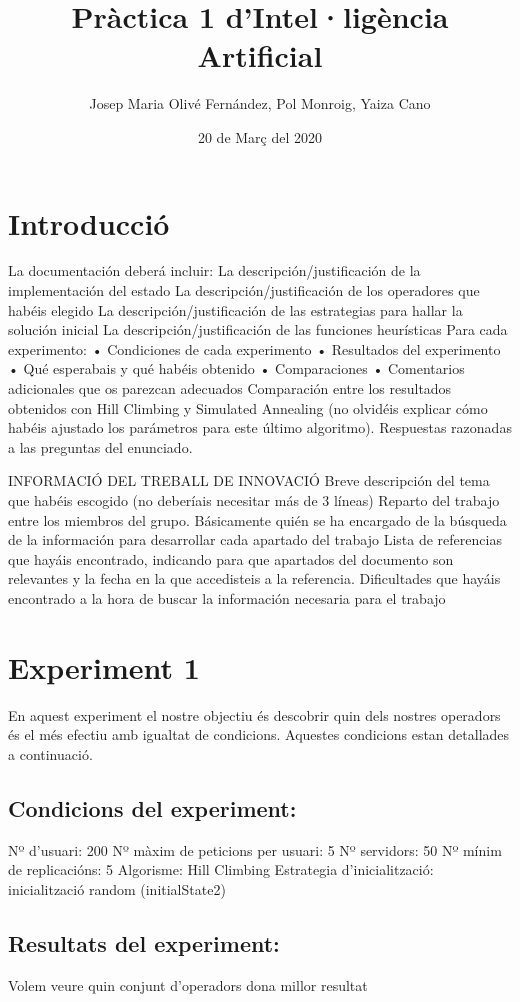 \documentclass[a4paper,10pt]{report}
\title{Pràctica 1 d'Intel·ligència Artificial}
\author{Josep Maria Olivé Fernández,
        Pol Monroig,
        Yaiza Cano}
\date{20 de Març del 2020}
\begin{document}
	\maketitle

	\chapter*{Introducció}

	La documentación deberá incluir:
	La descripción/justificación de la implementación del estado
	La descripción/justificación de los operadores que habéis elegido
	La descripción/justificación de las estrategias para hallar la solución inicial La descripción/justificación de las funciones heurísticas
	Para cada experimento:
	• Condiciones de cada experimento
	• Resultados del experimento
	• Qué esperabais y qué habéis obtenido
	• Comparaciones
	• Comentarios adicionales que os parezcan adecuados
	Comparación entre los resultados obtenidos con Hill Climbing y Simulated Annealing (no olvidéis explicar cómo habéis ajustado los parámetros para este último algoritmo).
	Respuestas razonadas a las preguntas del enunciado.



	INFORMACIÓ DEL TREBALL DE INNOVACIÓ
	Breve descripción del tema que habéis escogido (no deberíais necesitar más de 3 líneas)
	Reparto del trabajo entre los miembros del grupo. Básicamente quién se ha encargado de la búsqueda de la información para desarrollar cada apartado del trabajo
	Lista de referencias que hayáis encontrado, indicando para que apartados del documento son relevantes y la fecha en la que accedisteis a la referencia.
	Dificultades que hayáis encontrado a la hora de buscar la información necesaria para el trabajo


	\chapter*{Experiment 1}

		En aquest experiment el nostre objectiu és descobrir quin dels nostres operadors és el més efectiu amb igualtat de condicions. Aquestes condicions estan detallades a continuació.\newline

		\section*{Condicions del experiment:}
		Nº d'usuari: 200\newline
		Nº màxim de peticions per usuari: 5\newline
		Nº servidors: 50\newline
		Nº mínim de replicacións: 5\newline
		Algorisme: Hill Climbing\newline
		Estrategia d'inicialització: inicialització random (initialState2)\newline

		\section*{Resultats del experiment:}
		Volem veure quin conjunt d'operadors dona millor resultat
\end{document}
